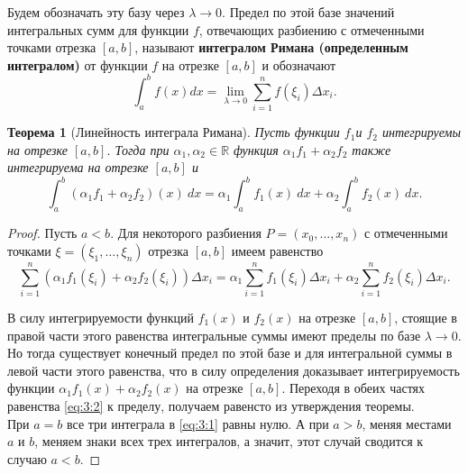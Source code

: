 \documentclass[12pt]{report}
\numberwithin{equation}{section}
\newtheorem{theorem}{Теорема}[section]
\begin{document}
Будем обозначать эту базу через $\lambda \to 0$. Предел по этой базе значений интегральных сумм для функции $f$, отвечающих разбиению с отмеченными точками отрезка $[a,b]$, называют \textbf{интегралом Римана (определенным интегралом)} от функции $f$ на отрезке $[a,b]$ и обозначают
\[ \int_{a}^b f(x) dx = \lim_{\lambda \to 0}\sum_{i=1}^n f(\xi_i) \Delta x_i.\]

\begin{theorem}[Линейность интеграла Римана] \label{th:3:1}
Пусть функции $f_1$и $f_2$ интегрируемы на отрезке $[a,b]$. Тогда при $\alpha_1, \alpha_2 \in \mathbb{R}$ функция $\alpha_1 f_1 + \alpha_2 f_2 $ также интегрируема на отрезке $[a,b]$ и 
\begin{equation}\label{eq:3:1}
\int_a^b (\alpha_1 f_1 + \alpha_2 f_2) (x) ~dx = \alpha_1 \int_a^b f_1(x) ~dx + \alpha_2 \int_a^b f_2(x)~dx. 
\end{equation}
\end{theorem}
\begin{proof} Пусть $a < b$. Для некоторого разбиения $P = (x_0, \ldots, x_n)$ с отмеченными точками $\xi = (\xi_1, \ldots, \xi_n)$ отрезка $[a,b]$ имеем равенство
\begin{equation}\label{eq:3:2}
\sum_{i=1}^n(\alpha_1f_1(\xi_i) + \alpha_2 f_2 (\xi_i))\Delta x_i = \alpha_1 \sum_{i=1}^n f_1 (\xi_i) \Delta x_i + \alpha_2 \sum_{i=1}^n f_2 (\xi_i) \Delta x_i.
\end{equation}

В силу интегрируемости функций $f_1(x)$ и $f_2(x)$ на отрезке $[a,b]$, стоящие в правой части этого равенства интегральные суммы имеют пределы по базе $\lambda \to 0$. Но тогда существует конечный предел по этой базе и для интегральной суммы в левой части этого равенства, что в силу определения доказывает интегрируемость функции $\alpha_1f_1(x) + \alpha_2 f_2(x)$ на отрезке $[a,b]$. Переходя в обеих частях равенства \eqref{eq:3:2} к пределу, получаем равенсто из утверждения теоремы.\\

При $a = b$ все три интеграла в \eqref{eq:3:1} равны нулю. А при $a > b$, меняя местами $a$ и $b$, меняем знаки всех трех интегралов, а значит, этот случай сводится к случаю $a < b$.
\end{proof}
\end{document}

